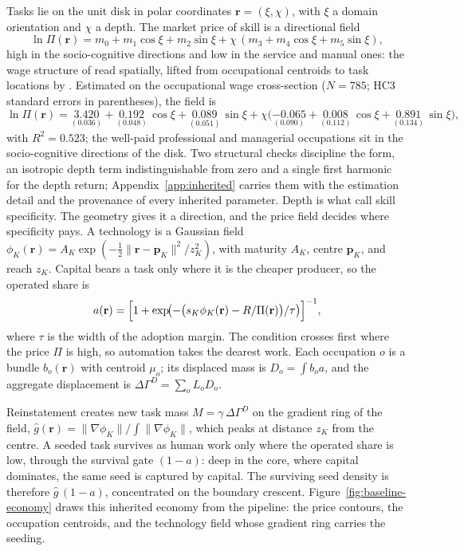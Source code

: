 \documentclass[12pt, a4paper]{article}
\newcommand{\rr}{\mathbf{r}}
\begin{document}
Tasks lie on the unit disk in polar coordinates $\rr = (\xi,\chi)$, with
$\xi$ a domain orientation and $\chi$ a depth. The market price of skill
is a directional field
\begin{equation}
\ln \Pi(\rr) = m_0 + m_1\cos\xi + m_2\sin\xi
+ \chi\,(m_3 + m_4\cos\xi + m_5\sin\xi),
\label{eq:price-field}
\end{equation}
high in the socio-cognitive directions and low in the service and manual
ones: the wage structure of \textcite{storck2026geometry} read
spatially, lifted from occupational centroids to task locations by
\textcite{storck2026fields}. Estimated on the occupational wage
cross-section ($N = 785$; HC3 standard errors in parentheses), the field
is
\begin{equation}
\ln \Pi(\rr) =
\underset{(0.036)}{3.420}
+ \underset{(0.048)}{0.192}\,\cos\xi
+ \underset{(0.051)}{0.089}\,\sin\xi
+ \chi\bigl(\underset{(0.090)}{-0.065}
+ \underset{(0.112)}{0.008}\,\cos\xi
+ \underset{(0.134)}{0.891}\,\sin\xi\bigr),
\label{eq:price-estimates}
\end{equation}
with $R^2 = 0.523$; the well-paid professional and managerial
occupations sit in the socio-cognitive directions of the disk. Two
structural checks discipline the form, an isotropic depth term
indistinguishable from zero and a single first harmonic for the depth
return; Appendix~\ref{app:inherited} carries them with the estimation
detail and the provenance of every inherited parameter. Depth is what
\textcite{adao2024fast} call skill specificity. The geometry gives it a
direction, and the price field decides where specificity pays. A technology is a Gaussian field
$\phi_K(\rr) = A_K\exp(-\tfrac12\lVert\rr-\mathbf p_K\rVert^2/z_K^2)$,
with maturity $A_K$, centre $\mathbf p_K$, and reach $z_K$. Capital bears
a task only where it is the cheaper producer, so the operated share is
\begin{equation}
a(\rr) = \Bigl[1+\exp\!\bigl(-\bigl(s_K\phi_K(\rr) - R/\Pi(\rr)\bigr)/\tau\bigr)\Bigr]^{-1},
\label{eq:operated}
\end{equation}
where $\tau$ is the width of the adoption margin. The condition
crosses first where the price $\Pi$ is high, so automation takes the
dearest work. Each occupation $o$ is a bundle $b_o(\rr)$ with centroid
$\mu_o$; its displaced mass is $D_o = \int b_o a$, and the aggregate
displacement is $\Delta\Gamma^D = \sum_o L_o D_o$.

Reinstatement creates new task mass $M = \gamma\,\Delta\Gamma^D$ on the
gradient ring of the field,
$\hat g(\rr) = \lVert\nabla\phi_K\rVert / \int\lVert\nabla\phi_K\rVert$,
which peaks at distance $z_K$ from the centre. A seeded task survives as
human work only where the operated share is low, through the survival
gate $(1-a)$: deep in the core, where capital dominates, the same seed is
captured by capital. The surviving seed density is therefore
$\hat g\,(1-a)$, concentrated on the boundary crescent.
Figure~\ref{fig:baseline-economy} draws this inherited economy from the
pipeline: the price contours, the occupation centroids, and the
technology field whose gradient ring carries the seeding.
\end{document}
